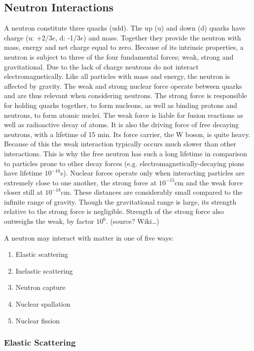 \subsection{Neutron Interactions}

A neutron constitute three quarks (udd). The up (u) and down (d) quarks have charge (u: +2/3$e$, d: -1/3$e$) and mass. Together they provide the neutron with mass, energy and net charge equal to zero. Because of its intrinsic properties, a neutron is subject to three of the four fundamental forces; weak, strong and gravitational. Due to the lack of charge neutrons do not interact electromagnetically.
Like all particles with mass and energy, the neutron is affected by gravity. The weak and strong nuclear force operate between quarks and are thus relevant when considering neutrons. The strong force is responsible for holding quarks together, to form nucleons, as well as binding protons and neutrons, to form atomic nuclei. The weak force is liable for fusion reactions as well as radioactive decay of atoms. It is also the driving force of free decaying neutrons, with a lifetime of 15 min. Its force carrier, the W boson, is quite heavy. Because of this the weak interaction typically occurs much slower than other interactions. This is why the free neutron has such a long lifetime in comparison to particles prone to other decay forces (e.g. electromagnetically-decaying pions have lifetime $10^{-16}$s).
Nuclear forces operate only when interacting particles are extremely close to one another, the strong force at $10^{-15}$cm and the weak force closer still at $10^{-18}$cm. These distances are considerably small compared to the infinite range of gravity. Though the gravitational range is large, its strength relative to the strong force is negligible. Strength of the strong force also outweighs the weak, by factor $10^6$. (source? Wiki…)

A neutron may interact with matter in one of five ways:
    \begin{enumerate}[noitemsep]
      \item Elastic scattering
      \item Inelastic scattering
      \item Neutron capture
      \item Nuclear spallation
      \item Nuclear fission
    \end{enumerate}

\subsubsection{Elastic Scattering}

